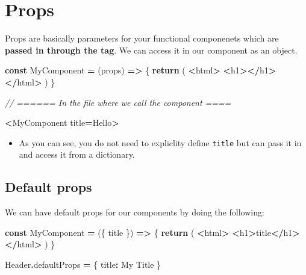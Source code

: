 \documentclass[
]{report}
\newenvironment{Shaded}{\begin{snugshade}}{\end{snugshade}}
\newcommand{\AttributeTok}[1]{\textcolor[rgb]{0.77,0.63,0.00}{#1}}
\newcommand{\CommentTok}[1]{\textcolor[rgb]{0.56,0.35,0.01}{\textit{#1}}}
\newcommand{\ControlFlowTok}[1]{\textcolor[rgb]{0.13,0.29,0.53}{\textbf{#1}}}
\newcommand{\DataTypeTok}[1]{\textcolor[rgb]{0.13,0.29,0.53}{#1}}
\newcommand{\KeywordTok}[1]{\textcolor[rgb]{0.13,0.29,0.53}{\textbf{#1}}}
\newcommand{\NormalTok}[1]{#1}
\newcommand{\OperatorTok}[1]{\textcolor[rgb]{0.81,0.36,0.00}{\textbf{#1}}}
\newcommand{\StringTok}[1]{\textcolor[rgb]{0.31,0.60,0.02}{#1}}
\providecommand{\tightlist}{%
  \setlength{\itemsep}{0pt}\setlength{\parskip}{0pt}}
\theoremstyle{definition}
\theoremstyle{definition}
\theoremstyle{definition}
\theoremstyle{definition}
\theoremstyle{remark}
\begin{document}
\hypertarget{props}{%
\section{Props}\label{props}}

Props are basically parameters for your functional componenets which are \textbf{passed in through the tag}. We can access it in our component as an object.

\begin{Shaded}
\begin{Highlighting}[]
\KeywordTok{const}\NormalTok{ MyComponent }\OperatorTok{=}\NormalTok{ (props) }\KeywordTok{=\textgreater{}}\NormalTok{ \{}
    \ControlFlowTok{return}\NormalTok{ (}
        \OperatorTok{\textless{}}\NormalTok{html}\OperatorTok{\textgreater{}}
            \OperatorTok{\textless{}}\NormalTok{h1}\OperatorTok{\textgreater{}\textless{}/}\NormalTok{h1}\OperatorTok{\textgreater{}}
        \OperatorTok{\textless{}/}\NormalTok{html}\OperatorTok{\textgreater{}} 
\NormalTok{    )}
\NormalTok{\}}

\CommentTok{// ====== In the file where we call the component ====}

\OperatorTok{\textless{}}\NormalTok{MyComponent title}\OperatorTok{=}\StringTok{\textquotesingle{}Hello\textquotesingle{}}\OperatorTok{\textgreater{}}
\end{Highlighting}
\end{Shaded}

\begin{itemize}
\tightlist
\item
  As you can see, you do not need to expliclity define \texttt{title} but can pass it in and access it from a dictionary.
\end{itemize}

\hypertarget{default-props}{%
\subsection{Default props}\label{default-props}}

We can have default props for our components by doing the following:

\begin{Shaded}
\begin{Highlighting}[]
\KeywordTok{const}\NormalTok{ MyComponent }\OperatorTok{=}\NormalTok{ (\{ title \}) }\KeywordTok{=\textgreater{}}\NormalTok{ \{}
    \ControlFlowTok{return}\NormalTok{ (}
        \OperatorTok{\textless{}}\NormalTok{html}\OperatorTok{\textgreater{}}
            \OperatorTok{\textless{}}\NormalTok{h1}\OperatorTok{\textgreater{}}\NormalTok{title}\OperatorTok{\textless{}/}\NormalTok{h1}\OperatorTok{\textgreater{}}
        \OperatorTok{\textless{}/}\NormalTok{html}\OperatorTok{\textgreater{}} 
\NormalTok{    )}
\NormalTok{\}}

\NormalTok{Header}\OperatorTok{.}\AttributeTok{defaultProps} \OperatorTok{=}\NormalTok{ \{}
    \DataTypeTok{title}\OperatorTok{:} \StringTok{\textquotesingle{}My Title\textquotesingle{}}
\NormalTok{\}}
\end{Highlighting}
\end{Shaded}
\end{document}
